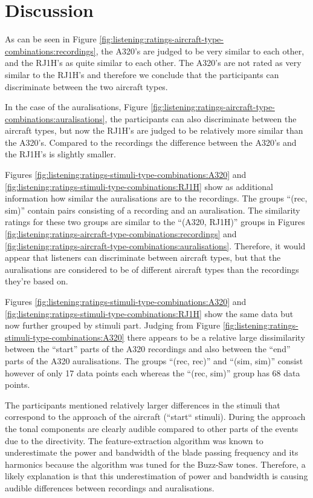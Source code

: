 \newpage
\section{Discussion}
As can be seen in Figure \ref{fig:listening:ratings-aircraft-type-combinations:recordings}, the A320's are judged to be very
similar to each other, and the RJ1H's as quite similar to each other. The A320's
are not rated as very similar to the RJ1H's and therefore we conclude that the
participants can discriminate between the two aircraft types.

In the case of the auralisations, Figure \ref{fig:listening:ratings-aircraft-type-combinations:auralisations}, the
participants can also discriminate between the aircraft types, but now the
RJ1H's are judged to be relatively more similar than the A320's. Compared to the recordings
the difference between the A320's and the RJ1H's is slightly smaller.


Figures \ref{fig:listening:ratings-stimuli-type-combinations:A320} and
\ref{fig:listening:ratings-stimuli-type-combinations:RJ1H} show as additional
information how similar the auralisations are to the recordings. The groups
``(rec, sim)'' contain pairs consisting of a recording and an auralisation. The
similarity ratings for these two groups are similar to the ``(A320, RJ1H)''
groups in Figures
\ref{fig:listening:ratings-aircraft-type-combinations:recordings} and
\ref{fig:listening:ratings-aircraft-type-combinations:auralisations}. Therefore,
it would appear that listeners can discriminate between aircraft types, but that
the auralisations are considered to be of different aircraft types than the
recordings they're based on.

Figures \ref{fig:listening:ratings-stimuli-type-combinations:A320} and
\ref{fig:listening:ratings-stimuli-type-combinations:RJ1H} show the same data
but now further grouped by stimuli part. Judging from Figure
\ref{fig:listening:ratings-stimuli-type-combinations:A320} there appears to be a
relative large dissimilarity between the ``start'' parts of the A320 recordings
and also between the ``end'' parts of the A320 auralisations. The groups ``(rec,
rec)'' and ``(sim, sim)'' consist however of only 17 data points each whereas
the ``(rec, sim)'' group has 68 data points.

The participants mentioned relatively larger differences in the stimuli that
correspond to the approach of the aircraft (``start`` stimuli). During the
approach the tonal components are clearly audible compared to other parts of the
events due to the directivity. The feature-extraction algorithm was known to
underestimate the power and bandwidth of the blade passing frequency and its
harmonics because the algorithm was tuned for the Buzz-Saw tones. Therefore, a
likely explanation is that this underestimation of power and bandwidth is
causing audible differences between recordings and auralisations.
